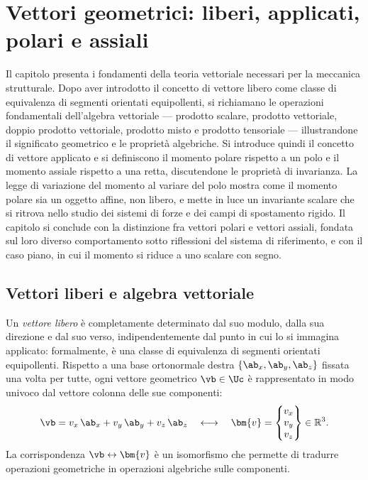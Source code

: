 \graphicspath{{Parti/P01-Preliminari/A04-Vettori_Polari_Assiali_Liberi_Applicati/Figure/}}
%	
\chapter{Vettori geometrici: liberi, applicati, polari e assiali}\label{app:vettori_geometrici}




\begin{sommario}
	Il capitolo presenta i fondamenti della teoria vettoriale necessari per	la meccanica strutturale. Dopo aver introdotto il concetto di vettore	libero come classe di equivalenza di segmenti orientati equipollenti,	si richiamano le operazioni fondamentali dell'algebra vettoriale ---	prodotto scalare, prodotto vettoriale, doppio prodotto vettoriale,	prodotto misto e prodotto tensoriale --- illustrandone il significato	geometrico e le proprietà algebriche. Si introduce quindi il concetto
	di vettore applicato e si definiscono il momento polare rispetto a un	polo e il momento assiale rispetto a una retta, discutendone le	proprietà di invarianza. La legge di variazione del momento al variare	del polo mostra come il momento polare sia un oggetto affine, non	libero, e mette in luce un invariante scalare che si ritrova nello studio dei sistemi di forze e dei campi di spostamento rigido.	Il capitolo si conclude con la distinzione fra vettori polari e vettori	assiali, fondata sul loro diverso comportamento sotto riflessioni del	sistema di riferimento, e con il caso piano, in cui il momento si	riduce a uno scalare con segno.
\end{sommario}

\section{Vettori liberi e algebra vettoriale}

Un \textit{vettore libero} è completamente determinato dal suo modulo,
dalla sua direzione e dal suo verso, indipendentemente dal punto in cui
lo si immagina applicato: formalmente, è una classe di equivalenza di
segmenti orientati equipollenti. Rispetto a una base ortonormale destra
$\{\ab_x, \ab_y, \ab_z\}$ fissata una volta per tutte, ogni vettore
geometrico $\vb \in \Uc$ è rappresentato in modo univoco dal vettore
colonna delle sue componenti:
\begin{equation}
	\vb = v_x\,\ab_x + v_y\,\ab_y + v_z\,\ab_z
	\quad\longleftrightarrow\quad
	\bm{v} = \begin{Bmatrix} v_x \\ v_y \\ v_z \end{Bmatrix} \in \mathbb{R}^3.
\end{equation}
La corrispondenza $\vb \leftrightarrow \bm{v}$ è un isomorfismo che
permette di tradurre operazioni geometriche in operazioni algebriche sulle
componenti. 


